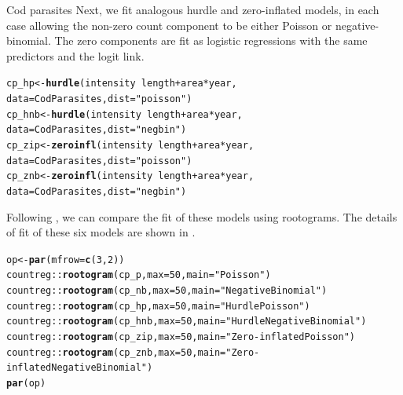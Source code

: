 \documentclass[11pt]{book}\usepackage[]{graphicx}\usepackage[]{color}
\makeatletter
\newcommand{\hlnum}[1]{\textcolor[rgb]{0.686,0.059,0.569}{#1}}%
\newcommand{\hlstr}[1]{\textcolor[rgb]{0.192,0.494,0.8}{#1}}%
\newcommand{\hlopt}[1]{\textcolor[rgb]{0,0,0}{#1}}%
\newcommand{\hlstd}[1]{\textcolor[rgb]{0.345,0.345,0.345}{#1}}%
\newcommand{\hlkwb}[1]{\textcolor[rgb]{0.69,0.353,0.396}{#1}}%
\newcommand{\hlkwc}[1]{\textcolor[rgb]{0.333,0.667,0.333}{#1}}%
\newcommand{\hlkwd}[1]{\textcolor[rgb]{0.737,0.353,0.396}{\textbf{#1}}}%
\newenvironment{kframe}{%
 \def\at@end@of@kframe{}%
 \ifinner\ifhmode%
  \def\at@end@of@kframe{\end{minipage}}%
  \begin{minipage}{\columnwidth}%
 \fi\fi%
 \def\FrameCommand##1{\hskip\@totalleftmargin \hskip-\fboxsep
 \colorbox{shadecolor}{##1}\hskip-\fboxsep
     \hskip-\linewidth \hskip-\@totalleftmargin \hskip\columnwidth}%
 \MakeFramed {\advance\hsize-\width
   \@totalleftmargin\z@ \linewidth\hsize
   \@setminipage}}%
 {\par\unskip\endMakeFramed%
 \at@end@of@kframe}
\newenvironment{knitrout}{}{} %
\renewenvironment{knitrout}{\small\renewcommand{\baselinestretch}{.85}}{} %
\makeatother
\begin{document}
\begin{Example}[cod2]{Cod parasites}
Next, we fit analogous hurdle and zero-inflated models, in each case allowing the non-zero
count component to be either Poisson or negative-binomial. The zero components are fit
as logistic regressions with the same predictors and the logit link.
\begin{knitrout}
\color{fgcolor}\begin{kframe}
\begin{alltt}
\hlstd{cp_hp}  \hlkwb{<-} \hlkwd{hurdle}\hlstd{(intensity} \hlopt{~} \hlstd{length} \hlopt{+} \hlstd{area} \hlopt{*} \hlstd{year,}
                 \hlkwc{data} \hlstd{= CodParasites,} \hlkwc{dist} \hlstd{=} \hlstr{"poisson"}\hlstd{)}
\hlstd{cp_hnb} \hlkwb{<-} \hlkwd{hurdle}\hlstd{(intensity} \hlopt{~} \hlstd{length} \hlopt{+} \hlstd{area} \hlopt{*} \hlstd{year,}
                 \hlkwc{data} \hlstd{= CodParasites,} \hlkwc{dist} \hlstd{=} \hlstr{"negbin"}\hlstd{)}
\hlstd{cp_zip} \hlkwb{<-} \hlkwd{zeroinfl}\hlstd{(intensity} \hlopt{~} \hlstd{length} \hlopt{+} \hlstd{area} \hlopt{*} \hlstd{year,}
                   \hlkwc{data} \hlstd{= CodParasites,} \hlkwc{dist} \hlstd{=} \hlstr{"poisson"}\hlstd{)}
\hlstd{cp_znb} \hlkwb{<-} \hlkwd{zeroinfl}\hlstd{(intensity} \hlopt{~} \hlstd{length} \hlopt{+} \hlstd{area} \hlopt{*} \hlstd{year,}
                   \hlkwc{data} \hlstd{= CodParasites,} \hlkwc{dist} \hlstd{=} \hlstr{"negbin"}\hlstd{)}
\end{alltt}
\end{kframe}
\end{knitrout}
Following , we can compare the fit of these models using rootograms.
The details of fit of these six models are shown in .
\begin{knitrout}
\color{fgcolor}\begin{kframe}
\begin{alltt}
\hlstd{op} \hlkwb{<-} \hlkwd{par}\hlstd{(}\hlkwc{mfrow} \hlstd{=} \hlkwd{c}\hlstd{(}\hlnum{3}\hlstd{,} \hlnum{2}\hlstd{))}
\hlstd{countreg::}\hlkwd{rootogram}\hlstd{(cp_p,} \hlkwc{max} \hlstd{=} \hlnum{50}\hlstd{,} \hlkwc{main} \hlstd{=} \hlstr{"Poisson"}\hlstd{)}
\hlstd{countreg::}\hlkwd{rootogram}\hlstd{(cp_nb,} \hlkwc{max} \hlstd{=} \hlnum{50}\hlstd{,} \hlkwc{main} \hlstd{=} \hlstr{"Negative Binomial"}\hlstd{)}
\hlstd{countreg::}\hlkwd{rootogram}\hlstd{(cp_hp,} \hlkwc{max} \hlstd{=} \hlnum{50}\hlstd{,} \hlkwc{main} \hlstd{=} \hlstr{"Hurdle Poisson"}\hlstd{)}
\hlstd{countreg::}\hlkwd{rootogram}\hlstd{(cp_hnb,} \hlkwc{max} \hlstd{=} \hlnum{50}\hlstd{,} \hlkwc{main} \hlstd{=} \hlstr{"Hurdle Negative Binomial"}\hlstd{)}
\hlstd{countreg::}\hlkwd{rootogram}\hlstd{(cp_zip,} \hlkwc{max} \hlstd{=} \hlnum{50}\hlstd{,} \hlkwc{main} \hlstd{=} \hlstr{"Zero-inflated Poisson"}\hlstd{)}
\hlstd{countreg::}\hlkwd{rootogram}\hlstd{(cp_znb,} \hlkwc{max} \hlstd{=} \hlnum{50}\hlstd{,} \hlkwc{main} \hlstd{=} \hlstr{"Zero-inflated Negative Binomial"}\hlstd{)}
\hlkwd{par}\hlstd{(op)}
\end{alltt}
\end{kframe}\begin{figure}[!htbp]



\end{figure}
\end{knitrout}
\end{Example}
\end{document}
